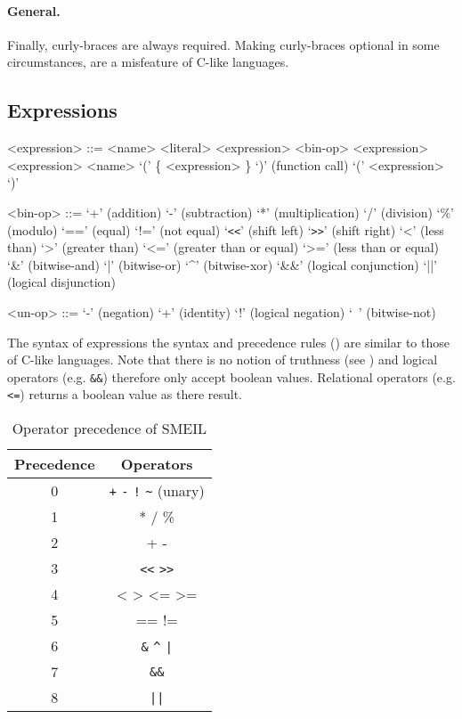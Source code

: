 \paragraph{General.} Finally, curly-braces are always required. Making
curly-braces optional in some circumstances, are a misfeature of C-like
languages.

\subsection{Expressions}
\begin{grammar}
  <expression> ::= <name>
  \alt <literal>
  \alt <expression> <bin-op> <expression>
   <expression>
  \alt <name> `(' \{ <expression> \}  `)' (function call)
  \alt `(' <expression> `)'

  <bin-op> ::= `+' (addition)
  \alt `-' (subtraction)
  \alt `*' (multiplication)
  \alt `/' (division)
  \alt `\%' (modulo)
  \alt `==' (equal)
  \alt `!=' (not equal)
  \alt `\verb!<<!' (shift left)
  \alt `\verb!>>!' (shift right)
  \alt `<' (less than)
  \alt `>' (greater than)
  \alt `<=' (greater than or equal)
  \alt `>=' (less than or equal)
  \alt `\&' (bitwise-and)
  \alt `|' (bitwise-or)
  \alt `^' (bitwise-xor)
  \alt `\&\&' (logical conjunction)
  \alt `||' (logical disjunction)

  <un-op> ::= `-' (negation)
  \alt `+' (identity)
  \alt `!' (logical negation)
  \alt `~' (bitwise-not)

\end{grammar}

The syntax of expressions the syntax and precedence rules () are
similar to those of C-like languages. Note that there is no notion of truthness
(see ) and logical operators (e.g. \texttt{\&\&}) therefore only
accept boolean values. Relational operators (e.g. \texttt{<=}) returns a boolean
value as there result. 


\begin{table}%
  \centering
\begin{tabular}{cc}
  \toprule
  \textbf{Precedence} & \textbf{Operators}\\
  \midrule
  0 & \verb!+! \verb!-! \verb|!| \verb!~! (unary)\\
  1 & * / \% \\
  2 & + - \\
  3 & \verb!<<! \verb!>>! \\
  4 & < > <= >= \\
  5 & == != \\
  6 & \verb!&! \verb!^! \verb!|! \\
  7 & \verb!&&! \\
  8 & \verb!||! \\
  \bottomrule
\end{tabular}
\caption{Operator precedence of SMEIL}
\label{tab:ops}
\end{table}

